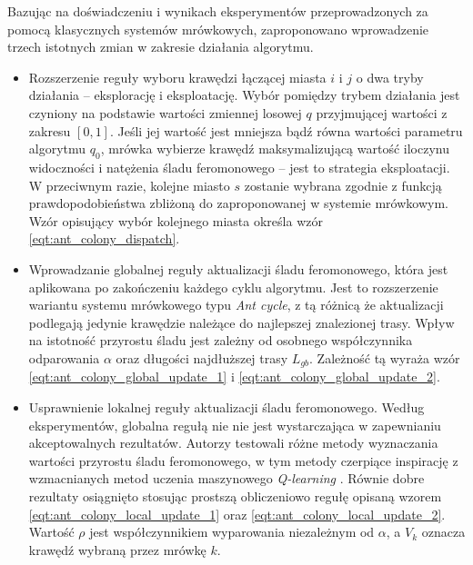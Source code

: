 {{{            Bazując na doświadczeniu i wynikach eksperymentów przeprowadzonych za pomocą klasycznych systemów
            mrówkowych, zaproponowano wprowadzenie trzech istotnych zmian w zakresie działania algorytmu.

            \begin{itemize}
                \item Rozszerzenie reguły wyboru krawędzi łączącej miasta $i$ i $j$ o dwa tryby działania -- eksplorację
                i eksploatację. Wybór pomiędzy trybem działania jest czyniony na podstawie wartości zmiennej losowej $q$
                przyjmującej wartości z zakresu $[0, 1]$. Jeśli jej wartość jest mniejsza bądź równa wartości parametru
                algorytmu $q_0$, mrówka wybierze krawędź maksymalizującą wartość iloczynu widoczności i natężenia śladu
                feromonowego -- jest to strategia eksploatacji. W przeciwnym razie, kolejne miasto $s$ zostanie wybrana
                zgodnie z funkcją prawdopodobieństwa zbliżoną do zaproponowanej w systemie mrówkowym. Wzór opisujący
                wybór kolejnego miasta określa wzór \ref{eqt:ant_colony_dispatch}.

                \item Wprowadzanie globalnej reguły aktualizacji śladu feromonowego, która jest aplikowana po
                zakończeniu każdego cyklu algorytmu. Jest to rozszerzenie wariantu systemu mrówkowego typu \textit{Ant
                cycle}, z tą różnicą że aktualizacji podlegają jedynie krawędzie należące do najlepszej znalezionej
                trasy. Wpływ na istotność przyrostu śladu jest zależny od osobnego współczynnika odparowania $\alpha$
                oraz długości najdłuższej trasy $L_{gb}$. Zależność tą wyraża wzór \ref{eqt:ant_colony_global_update_1}
                i \ref{eqt:ant_colony_global_update_2}.

                \item Usprawnienie lokalnej reguły aktualizacji śladu feromonowego. Według eksperymentów, globalna
                regułą nie nie jest wystarczająca w zapewnianiu akceptowalnych rezultatów. Autorzy testowali różne
                metody wyznaczania wartości przyrostu śladu feromonowego, w tym metody czerpiące inspirację z
                wzmacnianych metod uczenia maszynowego \textit{Q-learning} \cite{Watkins1989LearningFD}. Równie dobre
                rezultaty osiągnięto stosując prostszą obliczeniowo regułę opisaną wzorem
                \ref{eqt:ant_colony_local_update_1} oraz \ref{eqt:ant_colony_local_update_2}. Wartość $\rho$ jest
                współczynnikiem wyparowania niezależnym od $\alpha$, a $V_k$ oznacza krawędź wybraną przez mrówkę $k$.
            \end{itemize}

}}}
